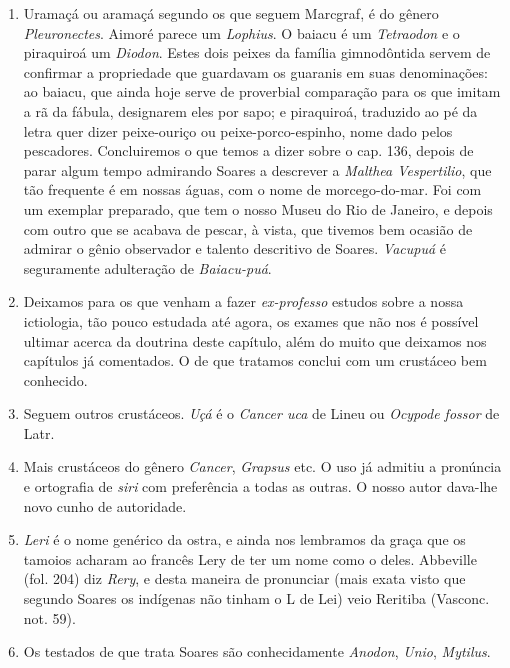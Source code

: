 \begin{enumerate}
\item Uramaçá ou aramaçá segundo os que seguem Marcgraf, é do gênero \textit{Pleuronectes}. 
Aimoré parece um \textit{Lophius}. O baiacu é um \textit{Tetraodon} e o piraquiroá 
um \textit{Diodon}. Estes dois peixes da família gimnodôntida servem de confirmar a 
propriedade que guardavam os guaranis em suas denominações: ao baiacu, que ainda 
hoje serve de proverbial comparação para os que imitam a rã da fábula, designarem 
eles por sapo; e piraquiroá, traduzido ao pé da letra quer dizer peixe-ouriço ou 
peixe-porco-espinho, nome dado pelos pescadores. Concluiremos o que temos a dizer sobre o 
cap. 136, depois de parar algum tempo admirando Soares a descrever a \textit{Malthea Vespertilio}, 
que tão frequente é em nossas águas, com o nome de morcego-do-mar. Foi 
com um exemplar preparado, que tem o nosso Museu do Rio de Janeiro, e depois com 
outro que se acabava de pescar, à vista, que tivemos bem ocasião de admirar o gênio 
observador e talento descritivo de Soares. \textit{Vacupuá} é seguramente adulteração de 
\textit{Baiacu-puá}.

\item Deixamos para os que venham a fazer \textit{ex-professo} estudos sobre a nossa 
ictiologia, tão pouco estudada até agora, os exames que não nos é possível ultimar 
acerca da doutrina deste capítulo, além do muito que deixamos nos capítulos já 
comentados. O de que tratamos conclui com um crustáceo bem conhecido.

\item Seguem outros crustáceos. \textit{Uçá} é o \textit{Cancer uca} de Lineu ou \textit{Ocypode fossor} de Latr.

\item Mais crustáceos do gênero \textit{Cancer}, \textit{Grapsus} etc. O uso já admitiu a pronúncia 
e ortografia de \textit{siri} com preferência a todas as outras. O nosso autor dava-lhe novo 
cunho de autoridade.

\item \textit{Leri} é o nome genérico da ostra, e ainda nos lembramos da graça que os tamoios 
acharam ao francês Lery de ter um nome como o deles. Abbeville (fol. 204) diz \textit{Rery}, e 
desta maneira de pronunciar (mais exata visto que segundo Soares os indígenas não 
tinham o L de Lei) veio Reritiba (Vasconc. not. 59).

\item Os testados de que trata Soares são conhecidamente \textit{Anodon}, \textit{Unio}, \textit{Mytilus}.


\end{enumerate}
